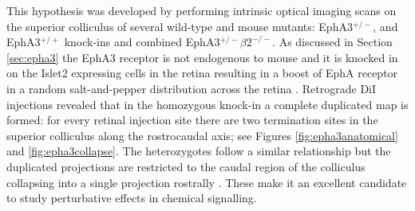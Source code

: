 This hypothesis was developed by performing intrinsic optical imaging scans on the superior colliculus of several wild-type and mouse mutants: EphA3$^{+/-}$, and EphA3$^{+/+}$ knock-ins and combined EphA3$^{+/-}$$\beta2^{-/-}$. As discussed in Section \ref{sec:epha3} the EphA3 receptor is not endogenous to mouse and it is knocked in on the Islet2 expressing cells in the retina resulting in a boost of EphA receptor in a random salt-and-pepper distribution across the retina \cite{Brown2000-da, Reber2004-wq}. Retrograde DiI injections revealed that in the homozygous knock-in a complete duplicated map is formed: for every retinal injection site there are two termination sites in the superior colliculus along the rostrocaudal axis; see Figures \ref{fig:epha3anatomical} and \ref{fig:epha3collapse}. The heterozygotes follow a similar relationship but the duplicated projections are restricted to the caudal region of the colliculus collapsing into a single projection rostrally \cite{Brown2000-da}. These make it an excellent candidate to study perturbative effects in chemical signalling.

